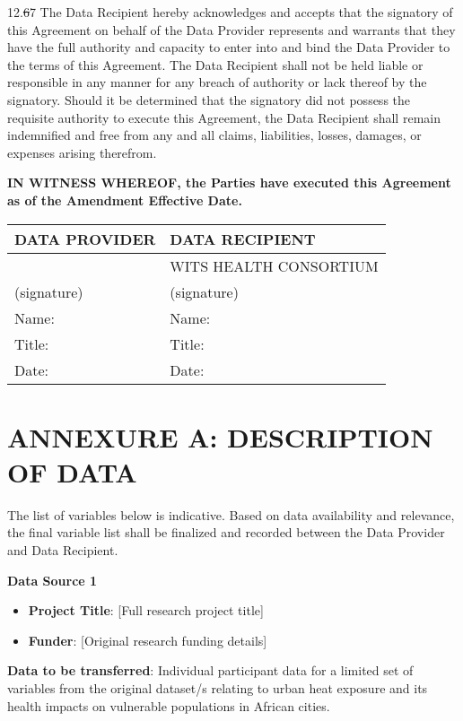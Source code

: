 \documentclass[12pt,letterpaper]{article}
\newcommand{\deleted}[1]{\textcolor{deletecolor}{\sout{#1}}}
\newcommand{\added}[1]{\textcolor{addcolor}{#1}}
\begin{document}
12.\deleted{6}\added{7} The Data Recipient hereby acknowledges and accepts that the signatory of this Agreement on behalf of the Data Provider represents and warrants that they have the full authority and capacity to enter into and bind the Data Provider to the terms of this Agreement. The Data Recipient shall not be held liable or responsible in any manner for any breach of authority or lack thereof by the signatory. Should it be determined that the signatory did not possess the requisite authority to execute this Agreement, the Data Recipient shall remain indemnified and free from any and all claims, liabilities, losses, damages, or expenses arising therefrom.

\textbf{IN WITNESS WHEREOF, the Parties have executed this Agreement as of the \added{Amendment} Effective Date.}

\vspace{1cm}

\begin{tabular}{|p{}|p{}|}
\hline
\textbf{DATA PROVIDER} & \textbf{DATA RECIPIENT} \\
\hline
 & WITS HEALTH CONSORTIUM \\
\hline
(signature) & (signature) \\
\hline
Name: & Name: \\
\hline
Title: & Title: \\
\hline
Date: & Date: \\
\hline
\end{tabular}

\newpage

\section*{ANNEXURE A: DESCRIPTION OF DATA}

The list of variables below is indicative. Based on data availability and relevance, the final variable list shall be finalized and recorded between the Data Provider and Data Recipient.

\textbf{Data Source 1}

\begin{itemize}
    \item \textbf{Project Title}: [Full research project title]
    \item \textbf{Funder}: [Original research funding details]
\end{itemize}

\textbf{Data to be transferred}: Individual participant data for a limited set of variables from the original dataset/s relating to urban heat exposure and its health impacts on vulnerable populations in African cities.
\end{document}

